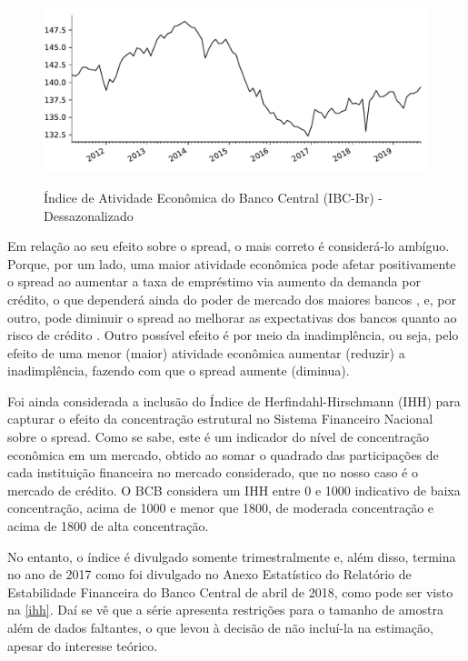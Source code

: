 \documentclass[a4paper,
               article,
               12pt,
               openany,
               oneside,
               english,
               brazil]{abntex2}
\numberwithin{equation}{section}
\begin{document}
    \begin{figure}[!hbt]
        \centering
        \caption{Índice de Atividade Econômica do Banco Central (IBC-Br) - Dessazonalizado}
        \includegraphics[width = \textwidth, scale=0.75]{ibc.pdf}
        \label{ibc}
    \end{figure}

    Em relação ao seu efeito sobre o spread, o mais correto é considerá-lo ambíguo. Porque, por um lado, uma maior atividade econômica pode afetar positivamente o spread ao aumentar a taxa de empréstimo via aumento da demanda por crédito, o que dependerá ainda do poder de mercado dos maiores bancos \textcite[626]{oreiro}, e, por outro, pode diminuir o spread ao melhorar as expectativas dos bancos quanto ao risco de crédito \textcite[24]{chaim}. Outro possível efeito é por meio da inadimplência, ou seja, pelo efeito de uma menor (maior) atividade econômica aumentar (reduzir) a inadimplência, fazendo com que o spread aumente (diminua).

    Foi ainda considerada a inclusão do Índice de Herfindahl-Hirschmann (IHH) para capturar o efeito da concentração estrutural no Sistema Financeiro Nacional sobre o spread. Como se sabe, este é um indicador do nível de concentração econômica em um mercado, obtido ao somar o quadrado das participações de cada instituição financeira no mercado considerado, que no nosso caso é o mercado de crédito. O BCB considera um IHH entre 0 e 1000 indicativo de baixa concentração, acima de 1000 e menor que 1800, de moderada concentração e acima de 1800 de alta concentração.
    
    No entanto, o índice é divulgado somente trimestralmente e, além disso, termina no ano de 2017 como foi divulgado no Anexo Estatístico do Relatório de Estabilidade Financeira do Banco Central de abril de 2018, como pode ser visto na \autoref{ihh}. Daí se vê que a série apresenta restrições para o tamanho de amostra além de dados faltantes, o que levou à decisão de não incluí-la na estimação, apesar do interesse teórico.
\end{document}
